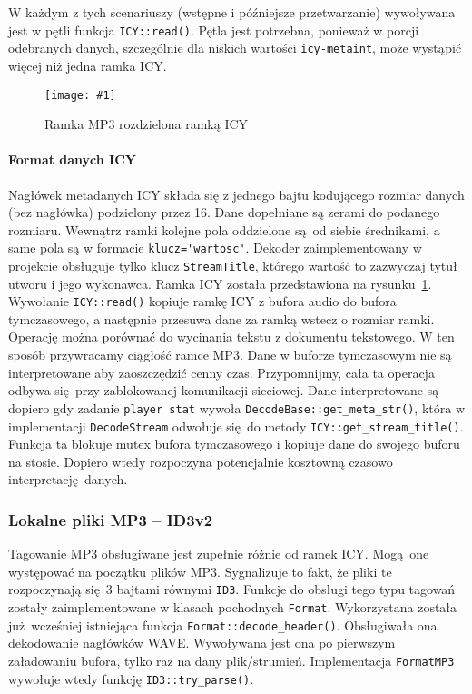 \documentclass[12pt]{report}
\newcommand{\imgint}[4]{
	\begin{figure}[{#4}]
		\centering
		\texttt{[image: \#1]}
		\caption{#2}
		\label{#1}
	\end{figure}
}
\newcommand{\imgcs}[3]{\imgint{#1}{#2}{#3}{}}
\begin{document}
		W każdym z tych scenariuszy (wstępne i późniejsze przetwarzanie) wywoływana jest w pętli funkcja \lstinline|ICY::read()|. Pętla jest potrzebna, ponieważ w porcji odebranych danych, szczególnie dla niskich wartości \lstinline|icy-metaint|, może wystąpić więcej niż jedna ramka ICY.
		
		\imgcs{3/PicoRadio-icy}{Ramka MP3 rozdzielona ramką ICY}{0.9}
		\paragraph{Format danych ICY}
			Nagłówek metadanych ICY składa się z jednego bajtu kodującego rozmiar danych (bez nagłówka) podzielony przez 16. Dane dopełniane są zerami do podanego rozmiaru. Wewnątrz ramki kolejne pola oddzielone są od siebie średnikami, a same pola są w formacie \lstinline|klucz='wartosc'|. Dekoder zaimplementowany w projekcie obsługuje tylko klucz \lstinline|StreamTitle|, którego wartość to zazwyczaj tytuł utworu i jego wykonawca. Ramka ICY została przedstawiona na rysunku~\ref{3/PicoRadio-icy}.
			$ $\\
			
		Wywołanie \lstinline|ICY::read()| kopiuje ramkę ICY z bufora audio do bufora tymczasowego, a następnie przesuwa dane za ramką wstecz o rozmiar ramki. Operację można porównać do wycinania tekstu z dokumentu tekstowego. W ten sposób przywracamy ciągłość ramce MP3. Dane w buforze tymczasowym nie są interpretowane aby zaoszczędzić cenny czas. Przypomnijmy, cała ta operacja odbywa się przy zablokowanej komunikacji sieciowej. Dane interpretowane są dopiero gdy zadanie \lstinline|player stat| wywoła \lstinline|DecodeBase::get_meta_str()|, która w implementacji \lstinline|DecodeStream| odwołuje się do metody \lstinline|ICY::get_stream_title()|. Funkcja ta blokuje mutex bufora tymczasowego i kopiuje dane do swojego buforu na stosie. Dopiero wtedy rozpoczyna potencjalnie kosztowną czasowo interpretację danych.
	
	\subsubsection{Lokalne pliki MP3 -- ID3v2}
		Tagowanie MP3 obsługiwane jest zupełnie różnie od ramek ICY. Mogą one występować na początku plików MP3. Sygnalizuje to fakt, że pliki te rozpoczynają się 3 bajtami równymi \lstinline|ID3|. Funkcje do obsługi tego typu tagowań zostały zaimplementowane w klasach pochodnych \lstinline|Format|. Wykorzystana została już wcześniej istniejąca funkcja \lstinline|Format::decode_header()|. Obsługiwała ona dekodowanie nagłówków WAVE. Wywoływana jest ona po pierwszym załadowaniu bufora, tylko raz na dany plik/strumień. Implementacja \lstinline|FormatMP3| wywołuje wtedy funkcję \lstinline|ID3::try_parse()|.
		
\end{document}
